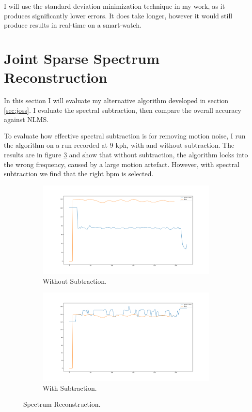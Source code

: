 \documentclass[12pt,a4paper,twoside,openany]{report}
\begin{document}
I will use the standard deviation minimization technique in my work, as it
produces significantly lower errors. It does take longer, however it would
still produce results in real-time on a smart-watch.

\section{Joint Sparse Spectrum Reconstruction}

In this section I will evaluate my alternative algorithm developed in section
\ref{sec:joss}. I evaluate the spectral subtraction, then compare the
overall accuracy against NLMS.

To evaluate how effective spectral subtraction is for removing motion noise, I
run the algorithm on a run recorded at 9 kph, with and without subtraction.
The results are in figure \ref{fig:joss_eg} and show that without subtraction,
the algorithm locks into the wrong frequency, caused by a large motion
artefact. However, with spectral subtraction we find that the right bpm is
selected.

\begin{figure}[H]
\begin{subfigure}{.5\textwidth}
  \centering
  \includegraphics[width=\linewidth]{figs/joss_nosub.png}
  \caption{Without Subtraction.}
  \label{fig:joss_nosub}
\end{subfigure}%
\begin{subfigure}{.5\textwidth}
  \centering
  \includegraphics[width=\linewidth]{figs/joss_sub.png}
  \caption{With Subtraction.}
  \label{fig:joss_sub}
\end{subfigure}
\caption{Spectrum Reconstruction.}
\label{fig:joss_eg}
\end{figure}
\end{document}
